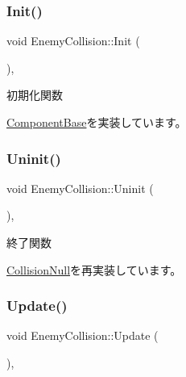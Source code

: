 \subsubsection{\texorpdfstring{Init()}{Init()}}
{\footnotesize\ttfamily void Enemy\+Collision\+::\+Init (\begin{DoxyParamCaption}{ }\end{DoxyParamCaption})\hspace{0.3cm}{\ttfamily [override]}, {\ttfamily [virtual]}}



初期化関数 



\mbox{\hyperlink{class_component_base_a125939d6befe42f28886a6523e86b18b}{Component\+Base}}を実装しています。

\mbox{\label{class_enemy_collision_a2a194c606fd162db803c70c6fed9b9e4}} 
\subsubsection{\texorpdfstring{Uninit()}{Uninit()}}
{\footnotesize\ttfamily void Enemy\+Collision\+::\+Uninit (\begin{DoxyParamCaption}{ }\end{DoxyParamCaption})\hspace{0.3cm}{\ttfamily [override]}, {\ttfamily [virtual]}}



終了関数 



\mbox{\hyperlink{class_collision_null_a7c6d0ec502efc55e2f406415451152f5}{Collision\+Null}}を再実装しています。

\mbox{\label{class_enemy_collision_ab54133504d867c6d2070d2f3854a0aaf}} 
\subsubsection{\texorpdfstring{Update()}{Update()}}
{\footnotesize\ttfamily void Enemy\+Collision\+::\+Update (\begin{DoxyParamCaption}{ }\end{DoxyParamCaption})\hspace{0.3cm}{\ttfamily [override]}, {\ttfamily [virtual]}}



